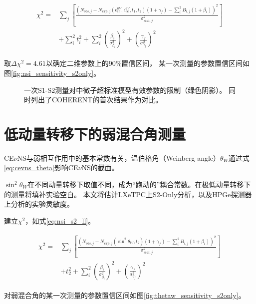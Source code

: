 \begin{align}
    \label{eq:nsi_s1s2_ll}
    \begin{split}
    \chi^2 =& \sum_j\left[\frac{\left(N_{obs,j} - N_{exp,j}(\epsilon^{uV}_{ee}, \epsilon^{dV}_{ee}, t_1, t_2)(1 + \gamma_f) 
    - \sum_{i}^2 B_{i,j}(1 + \beta_i)\right)^2}{\sigma^2_{stat,j}}\right] \\
    & + \sum_{i}^2 t_i^2 + \sum_{i}^2(\frac{\beta_i}{\sigma^2_{\beta_i}})^2 + (\frac{\gamma_f}{\sigma^2_{\gamma_f}})^2
    \end{split}
\end{align}

取$\Delta \chi^2=4.61$以确定二维参数上的90\%置信区间，
某一次测量的参数置信区间如图\ref{fig:nsi_sensitivity_s2only}。

\begin{figure}
  \centering
  
  \caption{\label{fig:nsi_sensitivity_s1s2} 一次S1-S2测量对中微子超标准模型有效参数的限制（绿色阴影）。
  同时列出了COHERENT的首次结果作为对比\cite{akimov_observation_2017}。}
\end{figure}

\section{低动量转移下的弱混合角测量}

CE$\nu$NS与弱相互作用中的基本常数有关，温伯格角（Weinberg angle）$\theta_W$通过式\ref{eq:cevns_theta}影响CE$\nu$NS的截面。

$\sin^2\theta_W$在不同动量转移下取值不同，成为``跑动的''耦合常数。在极低动量转移下的测量将填补实验空白。
本文将估计LXeTPC上S2-Only分析，以及HPGe探测器上分析的实验灵敏度。

建立$\chi^2$，如式\ref{eq:nsi_s2_ll}。

\begin{align}
    \label{eq:thets_s2_ll}
    \begin{split}
    \chi^2 =& \sum_j\left[\frac{\left(N_{obs,j} - N_{exp,j}(\sin^2\theta_W, t_2)(1 + \gamma_f) 
    - \sum_{i}^2 B_{i,j}(1 + \beta_i)\right)^2}{\sigma^2_{stat,j}}\right] \\
    & + t_2^2 + \sum_{i}^2(\frac{\beta_i}{\sigma^2_{\beta_i}})^2 + (\frac{\gamma_f}{\sigma^2_{\gamma_f}})^2
    \end{split}
\end{align}

对弱混合角的某一次测量的参数置信区间如图\ref{fig:thetaw_sensitivity_s2only}。

